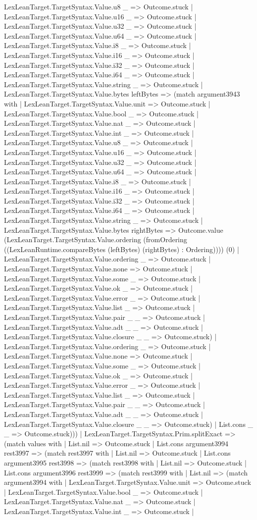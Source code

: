 \documentclass[11pt]{article}
\begin{document}
LexLeanTarget.TargetSyntax.Value.u8 \_ => Outcome.stuck | LexLeanTarget.TargetSyntax.Value.u16 \_ => Outcome.stuck | LexLeanTarget.TargetSyntax.Value.u32 \_ => Outcome.stuck | LexLeanTarget.TargetSyntax.Value.u64 \_ => Outcome.stuck | LexLeanTarget.TargetSyntax.Value.i8 \_ => Outcome.stuck | LexLeanTarget.TargetSyntax.Value.i16 \_ => Outcome.stuck | LexLeanTarget.TargetSyntax.Value.i32 \_ => Outcome.stuck | LexLeanTarget.TargetSyntax.Value.i64 \_ => Outcome.stuck | LexLeanTarget.TargetSyntax.Value.string \_ => Outcome.stuck | LexLeanTarget.TargetSyntax.Value.bytes leftBytes => (match argument3943 with | LexLeanTarget.TargetSyntax.Value.unit => Outcome.stuck | LexLeanTarget.TargetSyntax.Value.bool \_ => Outcome.stuck | LexLeanTarget.TargetSyntax.Value.nat \_ => Outcome.stuck | LexLeanTarget.TargetSyntax.Value.int \_ => Outcome.stuck | LexLeanTarget.TargetSyntax.Value.u8 \_ => Outcome.stuck | LexLeanTarget.TargetSyntax.Value.u16 \_ => Outcome.stuck | LexLeanTarget.TargetSyntax.Value.u32 \_ => Outcome.stuck | LexLeanTarget.TargetSyntax.Value.u64 \_ => Outcome.stuck | LexLeanTarget.TargetSyntax.Value.i8 \_ => Outcome.stuck | LexLeanTarget.TargetSyntax.Value.i16 \_ => Outcome.stuck | LexLeanTarget.TargetSyntax.Value.i32 \_ => Outcome.stuck | LexLeanTarget.TargetSyntax.Value.i64 \_ => Outcome.stuck | LexLeanTarget.TargetSyntax.Value.string \_ => Outcome.stuck | LexLeanTarget.TargetSyntax.Value.bytes rightBytes => Outcome.value (LexLeanTarget.TargetSyntax.Value.ordering (fromOrdering ((LexLeanRuntime.compareBytes (leftBytes) (rightBytes) : Ordering)))) (0) | LexLeanTarget.TargetSyntax.Value.ordering \_ => Outcome.stuck | LexLeanTarget.TargetSyntax.Value.none => Outcome.stuck | LexLeanTarget.TargetSyntax.Value.some \_ => Outcome.stuck | LexLeanTarget.TargetSyntax.Value.ok \_ => Outcome.stuck | LexLeanTarget.TargetSyntax.Value.error \_ => Outcome.stuck | LexLeanTarget.TargetSyntax.Value.list \_ => Outcome.stuck | LexLeanTarget.TargetSyntax.Value.pair \_ \_ => Outcome.stuck | LexLeanTarget.TargetSyntax.Value.adt \_ \_ => Outcome.stuck | LexLeanTarget.TargetSyntax.Value.closure \_ \_ => Outcome.stuck) | LexLeanTarget.TargetSyntax.Value.ordering \_ => Outcome.stuck | LexLeanTarget.TargetSyntax.Value.none => Outcome.stuck | LexLeanTarget.TargetSyntax.Value.some \_ => Outcome.stuck | LexLeanTarget.TargetSyntax.Value.ok \_ => Outcome.stuck | LexLeanTarget.TargetSyntax.Value.error \_ => Outcome.stuck | LexLeanTarget.TargetSyntax.Value.list \_ => Outcome.stuck | LexLeanTarget.TargetSyntax.Value.pair \_ \_ => Outcome.stuck | LexLeanTarget.TargetSyntax.Value.adt \_ \_ => Outcome.stuck | LexLeanTarget.TargetSyntax.Value.closure \_ \_ => Outcome.stuck) | List.cons \_ \_ => Outcome.stuck))) | LexLeanTarget.TargetSyntax.Prim.splitExact => (match values with | List.nil => Outcome.stuck | List.cons argument3994 rest3997 => (match rest3997 with | List.nil => Outcome.stuck | List.cons argument3995 rest3998 => (match rest3998 with | List.nil => Outcome.stuck | List.cons argument3996 rest3999 => (match rest3999 with | List.nil => (match argument3994 with | LexLeanTarget.TargetSyntax.Value.unit => Outcome.stuck | LexLeanTarget.TargetSyntax.Value.bool \_ => Outcome.stuck | LexLeanTarget.TargetSyntax.Value.nat \_ => Outcome.stuck | LexLeanTarget.TargetSyntax.Value.int \_ => Outcome.stuck | 
\end{document}
